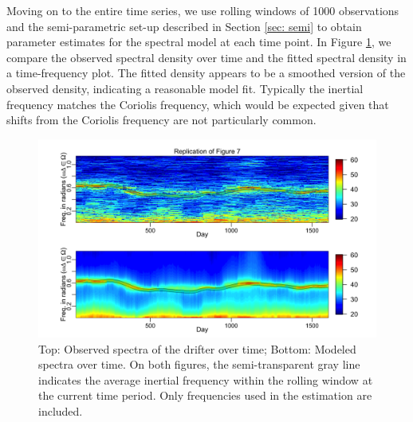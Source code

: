 \documentclass{stat572Style}
\begin{document}
\par
Moving on to the entire time series, we use rolling windows of 1000 observations and the semi-parametric set-up described in Section \ref{sec: semi}  to obtain parameter estimates for the spectral model at each time point.
 In Figure \ref{fig:timeVarying}, we compare the observed spectral density over time and the fitted spectral density in a time-frequency plot. 
  The fitted density appears to be a smoothed version of the observed density,  indicating a reasonable model fit.
   Typically the inertial frequency matches the Coriolis frequency, which would be expected given that shifts from the Coriolis frequency are not particularly common. 
   
   \begin{figure}[h!]
  \centering
    \includegraphics[width=.95\textwidth]{ReplicatedFigures/fig7.png}
        \caption{Top: Observed spectra of the drifter over time; Bottom: Modeled spectra over time. On both figures, the semi-transparent gray line indicates the average inertial frequency within the rolling window at the current time period.  Only frequencies used in the estimation are included.  }
        	\label{fig:timeVarying}
\end{figure}
\end{document}

